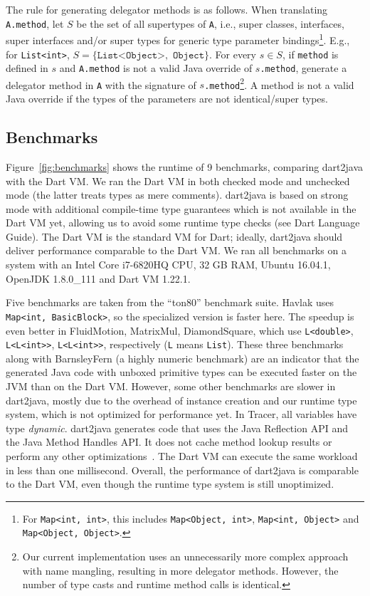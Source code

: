 \documentclass[sigplan]{acmart}
\begin{document}
The rule for generating delegator methods is as follows. When translating \texttt{A.method}, let $S$ be the set of all supertypes of \texttt{A}, i.e., super classes, interfaces, super interfaces and/or super types for generic type parameter bindings\footnote{For \texttt{Map<int, int>}, this includes \texttt{Map<Object, int>}, \texttt{Map<int, Object>} and \texttt{Map<Object, Object>}.}. E.g., for \texttt{List<int>}, $S=\{\texttt{List<Object>},$ $ \texttt{Object} \}$. For every $s \in S$, if \texttt{method} is defined in $s$ and \texttt{A.method} is not a valid Java override of \texttt{$s$.method}, generate a delegator method in \texttt{A} with the signature of \texttt{$s$.method}\footnote{Our current implementation uses an unnecessarily more complex approach with name mangling, resulting in more delegator methods. However, the number of type casts and runtime method calls is identical.}. A method is not a valid Java override if the types of the parameters are not identical/super types.



\subsection{Benchmarks}
Figure~\ref{fig:benchmarks} shows the runtime of 9 benchmarks, comparing dart2java with the Dart VM. We ran the Dart VM in both checked mode and unchecked mode (the latter treats types as mere comments). dart2java is based on strong mode with additional compile-time type guarantees which is not available in the Dart VM yet, allowing us to avoid some runtime type checks (see Dart Language Guide). The Dart VM is the standard VM for Dart; ideally, dart2java should deliver performance comparable to the Dart VM. We ran all benchmarks on a system with an Intel Core i7-6820HQ CPU, 32 GB RAM, Ubuntu 16.04.1, OpenJDK 1.8.0\_111 and Dart VM 1.22.1.

Five benchmarks are taken from the ``ton80'' benchmark suite. Havlak uses \texttt{Map<int, BasicBlock>}, so the specialized version is faster here. The speedup is even better in FluidMotion, MatrixMul, DiamondSquare, which use \texttt{L<double>}, \texttt{L<L<int>{>}},  \texttt{L<L<int>{>}}, respectively (\texttt{L} means \texttt{List}). These three benchmarks along with BarnsleyFern (a highly numeric benchmark) are an indicator that the generated Java code with unboxed primitive types can be executed faster on the JVM than on the Dart VM. However, some other benchmarks are slower in dart2java, mostly due to the overhead of instance creation and our runtime type system, which is not optimized for performance yet. In Tracer, all variables have type \emph{dynamic}. dart2java generates code that uses the Java Reflection API and the Java Method Handles API. It does not cache method lookup results or perform any other optimizations~\cite{Marr:2015:ZMR:2737924.2737963}. The Dart VM can execute the same workload in less than one millisecond. Overall, the performance of dart2java is comparable to the Dart VM, even though the runtime type system is still unoptimized.
\end{document}
